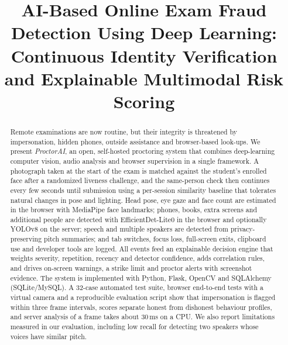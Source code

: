 \documentclass[conference]{IEEEtran}
\begin{document}
\title{AI-Based Online Exam Fraud Detection Using Deep Learning: Continuous Identity Verification and Explainable Multimodal Risk Scoring}

\author{
\and
{}
\and
{}
}

\maketitle

\begin{abstract}
Remote examinations are now routine, but their integrity is threatened by impersonation, hidden phones, outside assistance and browser-based look-ups. We present \emph{ProctorAI}, an open, self-hosted proctoring system that combines deep-learning computer vision, audio analysis and browser supervision in a single framework. A photograph taken at the start of the exam is matched against the student's enrolled face after a randomized liveness challenge, and the same-person check then continues every few seconds until submission using a per-session similarity baseline that tolerates natural changes in pose and lighting. Head pose, eye gaze and face count are estimated in the browser with MediaPipe face landmarks; phones, books, extra screens and additional people are detected with EfficientDet-Lite0 in the browser and optionally YOLOv8 on the server; speech and multiple speakers are detected from privacy-preserving pitch summaries; and tab switches, focus loss, full-screen exits, clipboard use and developer tools are logged. All events feed an explainable decision engine that weights severity, repetition, recency and detector confidence, adds correlation rules, and drives on-screen warnings, a strike limit and proctor alerts with screenshot evidence. The system is implemented with Python, Flask, OpenCV and SQLAlchemy (SQLite/MySQL). A 32-case automated test suite, browser end-to-end tests with a virtual camera and a reproducible evaluation script show that impersonation is flagged within three frame intervals, scores separate honest from dishonest behaviour profiles, and server analysis of a frame takes about 30\,ms on a CPU. We also report limitations measured in our evaluation, including low recall for detecting two speakers whose voices have similar pitch.
\end{abstract}
\end{document}
